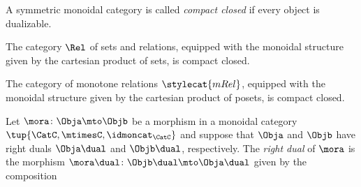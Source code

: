 \begin{ctdefinition}
    \label{def:compact-closed-category}
    A symmetric monoidal category is called \emph{compact closed} if every object is dualizable.
\end{ctdefinition}


\begin{example}
The category $\Rel$ of sets and relations, equipped with the monoidal structure given by the cartesian product of sets, is compact closed. 
\end{example}

\begin{example}
The category of monotone relations $\stylecat{mRel}$, equipped with the monoidal structure given by the cartesian product of posets, is compact closed. 


\end{example}


\begin{ctdefinition}\label{def:dual-morphism}
    Let $\mora \colon \Obja \mto \Objb$ be a morphism in a monoidal category $\tup{\CatC,\mtimesC,\idmoncat_{\CatC}}$ and suppose that $\Obja$ and $\Objb$ have right duals $\Obja\dual$ and $\Objb\dual$, respectively.
    The \emph{right dual} of $\mora$ is the morphism $\mora\dual \colon \Objb\dual \mto \Obja\dual$ given by the composition
\end{ctdefinition}

